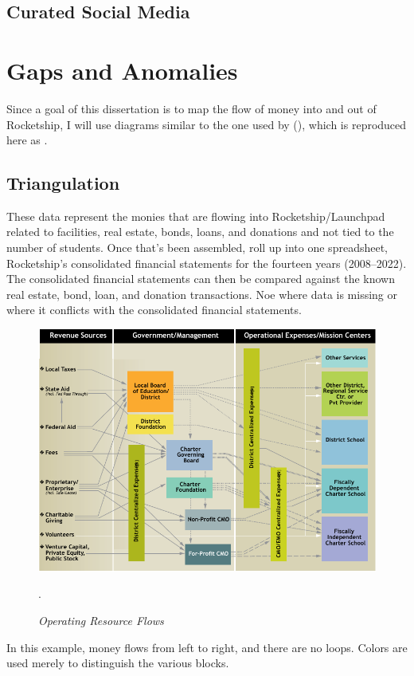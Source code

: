 \subsection{Curated Social Media}\label{sec:findings-curated-social-media}\indent


\section{Gaps and Anomalies}\label{sec:findings-gaps-anomolies}\indent

Since a goal of this dissertation is to map the flow of money into and out of Rocketship, I will use diagrams similar to the one used by \citeauthor{Baker.Miron2015} (\citeyear{Baker.Miron2015}), which is reproduced here as .

\subsection{Triangulation}\label{sec:findings-triangulation}\indent

These data represent the monies that are flowing into Rocketship/Launchpad related to facilities, real estate, bonds, loans, and donations and not tied to the number of students. Once that's been assembled, roll up into one spreadsheet, Rocketship's consolidated financial statements for the fourteen years (2008--2022). The consolidated financial statements can then be compared against the known real estate, bond, loan, and donation transactions. Noe where data is missing or where it conflicts with the consolidated financial statements.

\begin{figure}[ht]
  \centering
  \caption[Operating Resource Flows]{\textit{Operating Resource Flows}}\label{fig:opresflows}
  \includegraphics[width=\textwidth]{Operating_Resource_Flows}\\
  \footnotesize\raggedright\textcite[16]{Baker.Miron2015}.
\end{figure}
In this example, money flows from left to right, and there are no loops. Colors are used merely to distinguish the various blocks.


